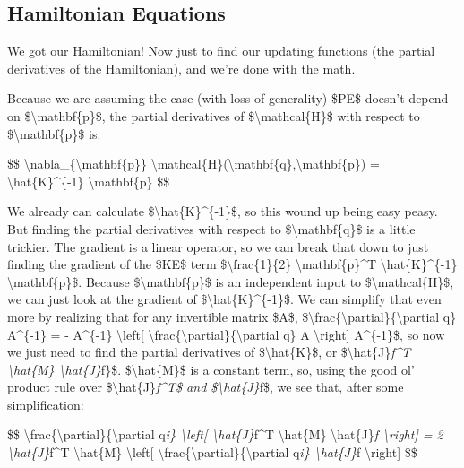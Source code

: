 \documentclass[]{article}
\begin{document}
\subsection{Hamiltonian Equations}

We got our Hamiltonian! Now just to find our updating functions (the partial
derivatives of the Hamiltonian), and we're done with the math.

Because we are assuming the case (with loss of generality) \$PE\$ doesn't depend
on \$\textbackslash{}mathbf\{p\}\$, the partial derivatives of
\$\textbackslash{}mathcal\{H\}\$ with respect to \$\textbackslash{}mathbf\{p\}\$
is:

\$\$ \textbackslash{}nabla\_\{\textbackslash{}mathbf\{p\}\}
\textbackslash{}mathcal\{H\}(\textbackslash{}mathbf\{q\},\textbackslash{}mathbf\{p\})
= \textbackslash{}hat\{K\}\^{}\{-1\} \textbackslash{}mathbf\{p\} \$\$

We already can calculate \$\textbackslash{}hat\{K\}\^{}\{-1\}\$, so this wound
up being easy peasy. But finding the partial derivatives with respect to
\$\textbackslash{}mathbf\{q\}\$ is a little trickier. The gradient is a linear
operator, so we can break that down to just finding the gradient of the \$KE\$
term \$\textbackslash{}frac\{1\}\{2\} \textbackslash{}mathbf\{p\}\^{}T
\textbackslash{}hat\{K\}\^{}\{-1\} \textbackslash{}mathbf\{p\}\$. Because
\$\textbackslash{}mathbf\{p\}\$ is an independent input to
\$\textbackslash{}mathcal\{H\}\$, we can just look at the gradient of
\$\textbackslash{}hat\{K\}\^{}\{-1\}\$. We can simplify that even more by
realizing that for any invertible matrix \$A\$,
\$\textbackslash{}frac\{\textbackslash{}partial\}\{\textbackslash{}partial q\}
A\^{}\{-1\} = - A\^{}\{-1\} \textbackslash{}left{[}
\textbackslash{}frac\{\textbackslash{}partial\}\{\textbackslash{}partial q\} A
\textbackslash{}right{]} A\^{}\{-1\}\$, so now we just need to find the partial
derivatives of \$\textbackslash{}hat\{K\}\$, or
\$\textbackslash{}hat\{J\}\emph{f\^{}T \textbackslash{}hat\{M\}
\textbackslash{}hat\{J\}}f\}\$. \$\textbackslash{}hat\{M\}\$ is a constant term,
so, using the good ol' product rule over
\$\textbackslash{}hat\{J\}\emph{f\^{}T\$ and \$\textbackslash{}hat\{J\}}f\$, we
see that, after some simplification:

\$\$ \textbackslash{}frac\{\textbackslash{}partial\}\{\textbackslash{}partial
q\emph{i\} \textbackslash{}left{[} \textbackslash{}hat\{J\}}f\^{}T
\textbackslash{}hat\{M\} \textbackslash{}hat\{J\}\emph{f
\textbackslash{}right{]} = 2 \textbackslash{}hat\{J\}}f\^{}T
\textbackslash{}hat\{M\} \textbackslash{}left{[}
\textbackslash{}frac\{\textbackslash{}partial\}\{\textbackslash{}partial
q\emph{i\} \textbackslash{}hat\{J\}}f \textbackslash{}right{]} \$\$
\end{document}
